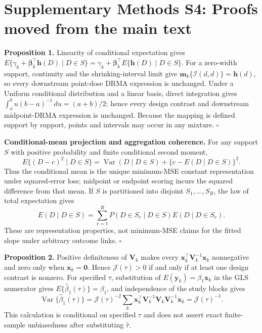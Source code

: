 \documentclass[11pt]{article}
\begin{document}
\section*{Supplementary Methods S4: Proofs moved from the main text}

\noindent\textbf{Proposition 1.}
Linearity of conditional expectation gives
$E\{\gamma_k+\boldsymbol\beta_k^\top\mathbf h(D)\mid D\in S\}
=\gamma_k+\boldsymbol\beta_k^\top E\{\mathbf h(D)\mid D\in S\}$.
For a zero-width support, continuity and the shrinking-interval limit give
$\mathbf m_k\{\mathcal I(d,d)\}=\mathbf h(d)$, so every downstream point-dose
DRMA expression is unchanged. Under a Uniform conditional distribution and a
linear basis, direct integration gives
$\int_a^b u(b-a)^{-1}\,du=(a+b)/2$; hence every design contrast and downstream
midpoint-DRMA expression is unchanged. Because the mapping is defined support
by support, points and intervals may occur in any mixture. \hfill$\square$

\noindent\textbf{Conditional-mean projection and aggregation coherence.}
For any support $S$ with positive probability and finite conditional second
moment,
\[
 E\{(D-c)^2\mid D\in S\}=\operatorname{Var}(D\mid D\in S)
 +\{c-E(D\mid D\in S)\}^2.
\]
Thus the conditional mean is the unique minimum-MSE constant representation
under squared-error loss; midpoint or endpoint scoring incurs the squared
difference from that mean. If $S$ is partitioned into disjoint
$S_1,\ldots,S_R$, the law of total expectation gives
\[
 E(D\mid D\in S)=\sum_{r=1}^R P(D\in S_r\mid D\in S)E(D\mid D\in S_r).
\]
These are representation properties, not minimum-MSE claims for the fitted
slope under arbitrary outcome links. \hfill$\square$

\noindent\textbf{Proposition 2.}
Positive definiteness of $\mathbf V_k$ makes every
$\mathbf x_k^\top\mathbf V_k^{-1}\mathbf x_k$ nonnegative and zero only when
$\mathbf x_k=\mathbf0$. Hence $\mathcal J(\tau)>0$ if and only if at least one
design contrast is nonzero. For specified $\tau$, substitution of
$E(\mathbf y_k)=\beta_1\mathbf x_k$ in the GLS numerator gives
$E\{\widehat\beta_1(\tau)\}=\beta_1$, and independence of the study blocks
gives
\[
 \operatorname{Var}\{\widehat\beta_1(\tau)\}
 =\mathcal J(\tau)^{-2}\sum_k
 \mathbf x_k^\top\mathbf V_k^{-1}\mathbf V_k
 \mathbf V_k^{-1}\mathbf x_k
 =\mathcal J(\tau)^{-1}.
\]
This calculation is conditional on specified $\tau$ and does not assert exact
finite-sample unbiasedness after substituting $\widehat\tau$.
\end{document}
